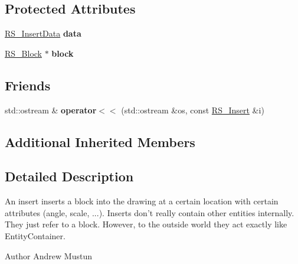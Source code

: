 \subsection*{Protected Attributes}
\begin{DoxyCompactItemize}
\item 
\hypertarget{classRS__Insert_a7dc8b2921bb073fd220a6f5c63f69184}{\hyperlink{classRS__InsertData}{R\-S\-\_\-\-Insert\-Data} {\bfseries data}}\label{classRS__Insert_a7dc8b2921bb073fd220a6f5c63f69184}

\item 
\hypertarget{classRS__Insert_a6cd2f8f607c4ad5d01371466a131b6cd}{\hyperlink{classRS__Block}{R\-S\-\_\-\-Block} $\ast$ {\bfseries block}}\label{classRS__Insert_a6cd2f8f607c4ad5d01371466a131b6cd}

\end{DoxyCompactItemize}
\subsection*{Friends}
\begin{DoxyCompactItemize}
\item 
\hypertarget{classRS__Insert_a1266d472d3c28716ccf1a971c2074d3f}{std\-::ostream \& {\bfseries operator$<$$<$} (std\-::ostream \&os, const \hyperlink{classRS__Insert}{R\-S\-\_\-\-Insert} \&i)}\label{classRS__Insert_a1266d472d3c28716ccf1a971c2074d3f}

\end{DoxyCompactItemize}
\subsection*{Additional Inherited Members}


\subsection{Detailed Description}
An insert inserts a block into the drawing at a certain location with certain attributes (angle, scale, ...). Inserts don't really contain other entities internally. They just refer to a block. However, to the outside world they act exactly like Entity\-Container.

\begin{DoxyAuthor}{Author}
Andrew Mustun 
\end{DoxyAuthor}


